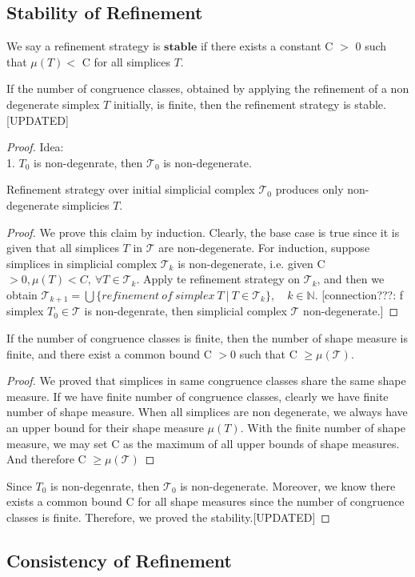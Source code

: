     \subsection{Stability of Refinement}
    \begin{definition*}
    We say a refinement strategy is $\textbf{stable}$ if there exists a constant C $>$ 0 such that $\mu(T)<$ C for all simplices $T$.
    \end{definition*}
    
    \begin{theorem*}
    If the number of congruence classes, obtained by applying the refinement of a non degenerate simplex $T$ initially, is finite, then the refinement strategy is stable.[UPDATED]
    \end{theorem*}
    \begin{proof}
    Idea:\\
    1. $T_0$ is non-degenrate, then $\mathcal{T_0}$ is non-degenerate.\\
    \begin{claim*}
    Refinement strategy over initial simplicial complex $\mathcal{T_0}$ produces only non-degenerate simplicies $T$.
    \begin{proof}
    We prove this claim by induction.
    Clearly, the base case is true since it is given that all simplices $T$ in $\mathcal{T}$ are non-degenerate. For induction, suppose simplices in simplicial complex $\mathcal{T}_k$ is non-degenerate, i.e. given C $> 0, \mu(T) < C, ~\forall T \in\mathcal{T}_k$. Apply te refinement strategy on $\mathcal{T}_k$, and then we obtain $\mathcal{T}_{k+1} = \bigcup\{refinement~of~simplex~T ~\vert ~T\in\mathcal{T}_{k}\}, \quad k\in\mathbb{N}$. [connection???: f simplex $T_0 \in\mathcal{T}$ is non-degenrate, then simplicial complex $\mathcal{T}$ non-degenerate.]
    \end{proof}
    \end{claim*}

    \begin{claim*}
    If the number of congruence classes is finite, then the number of shape measure is finite, and there exist a common bound C $> 0$ such that C $\geq \mu(\mathcal{T})$.
    \begin{proof}
    We proved that simplices in same congruence classes share the same shape measure. If we have finite number of congruence classes, clearly we have finite number of shape measure. When all simplices are non degenerate, we always have an upper bound for their shape measure $\mu(T)$. With the finite number of shape measure, we may set C as the maximum of all upper bounds of shape measures. And therefore C $\geq \mu(\mathcal{T})$
    \end{proof}
    \end{claim*}

    Since $T_0$ is non-degenrate, then $\mathcal{T_0}$ is non-degenerate. Moreover, we know there exists a common bound C for all shape measures since the number of congruence classes is finite. Therefore, we proved the stability.[UPDATED]
    \end{proof}
    
    
    \subsection{Consistency of Refinement}